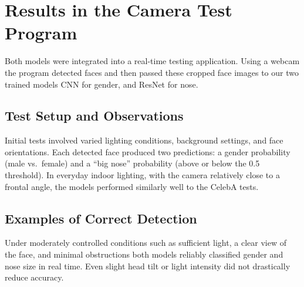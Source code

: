 \documentclass{article}
\begin{document}
\section{Results in the Camera Test Program}

Both models were integrated into a real-time testing application. Using a webcam the program detected faces and then passed these cropped face images to our two trained models CNN for gender, and ResNet for nose.

\subsection{Test Setup and Observations}
Initial tests involved varied lighting conditions, background settings, and face orientations. Each detected face produced two predictions: a gender probability (male vs.\ female) and a “big nose” probability (above or below the 0.5 threshold). In everyday indoor lighting, with the camera relatively close to a frontal angle, the models performed similarly well to the CelebA tests.

\subsection{Examples of Correct Detection}
Under moderately controlled conditions such as sufficient light, a clear view of the face, and minimal obstructions both models reliably classified gender and nose size in real time. Even slight head tilt or light intensity did not drastically reduce accuracy.
\end{document}
